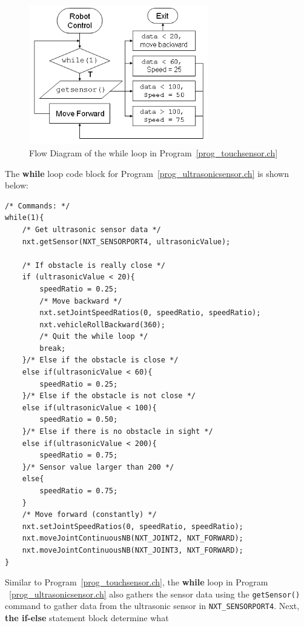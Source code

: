 \documentclass[11pt]{article}
\begin{document}
\begin{figure}[h]
  \begin{center}
    \includegraphics[height=2.4in]{figure/mindstorm/NXT_ultraflow.png}
    \caption{Flow Diagram of the while loop in Program~\ref{prog_touchsensor.ch} \label{fig_NXT_ultraflow}}
  \end{center}
\end{figure}
The {\bf while} loop code block for Program~\ref{prog_ultrasonicsensor.ch} is shown below:
\begin{lstlisting}
/* Commands: */
while(1){
    /* Get ultrasonic sensor data */
    nxt.getSensor(NXT_SENSORPORT4, ultrasonicValue);
        
    /* If obstacle is really close */
    if (ultrasonicValue < 20){
        speedRatio = 0.25;
        /* Move backward */
        nxt.setJointSpeedRatios(0, speedRatio, speedRatio);
        nxt.vehicleRollBackward(360);
        /* Quit the while loop */
        break;
    }/* Else if the obstacle is close */
    else if(ultrasonicValue < 60){
        speedRatio = 0.25;
    }/* Else if the obstacle is not close */
    else if(ultrasonicValue < 100){
        speedRatio = 0.50;
    }/* Else if there is no obstacle in sight */
    else if(ultrasonicValue < 200){
        speedRatio = 0.75;
    }/* Sensor value larger than 200 */
    else{
        speedRatio = 0.75;
    }
    /* Move forward (constantly) */
    nxt.setJointSpeedRatios(0, speedRatio, speedRatio);
    nxt.moveJointContinuousNB(NXT_JOINT2, NXT_FORWARD);
    nxt.moveJointContinuousNB(NXT_JOINT3, NXT_FORWARD);
}
\end{lstlisting}
Similar to Program~\ref{prog_touchsensor.ch}, the {\bf while} loop in Program
~\ref{prog_ultrasonicsensor.ch} also gathers the sensor data using the 
{\tt getSensor()} command to gather data from the ultrasonic sensor in 
{\tt NXT\_SENSORPORT4}. Next, {\bf the if-else} statement block determine what 
\end{document}
